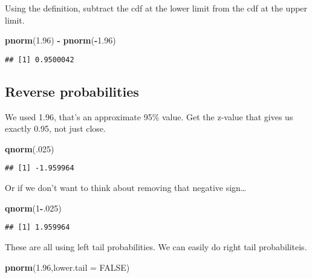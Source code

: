 \documentclass[]{article}
\newenvironment{Shaded}{\begin{snugshade}}{\end{snugshade}}
\newcommand{\KeywordTok}[1]{\textcolor[rgb]{0.13,0.29,0.53}{\textbf{#1}}}
\newcommand{\DataTypeTok}[1]{\textcolor[rgb]{0.13,0.29,0.53}{#1}}
\newcommand{\DecValTok}[1]{\textcolor[rgb]{0.00,0.00,0.81}{#1}}
\newcommand{\FloatTok}[1]{\textcolor[rgb]{0.00,0.00,0.81}{#1}}
\newcommand{\StringTok}[1]{\textcolor[rgb]{0.31,0.60,0.02}{#1}}
\newcommand{\OtherTok}[1]{\textcolor[rgb]{0.56,0.35,0.01}{#1}}
\newcommand{\OperatorTok}[1]{\textcolor[rgb]{0.81,0.36,0.00}{\textbf{#1}}}
\newcommand{\NormalTok}[1]{#1}
\begin{document}
Using the definition, subtract the cdf at the lower limit from the cdf
at the upper limit.

\begin{Shaded}
\begin{Highlighting}[]
\KeywordTok{pnorm}\NormalTok{(}\FloatTok{1.96}\NormalTok{) }\OperatorTok{-}\StringTok{ }\KeywordTok{pnorm}\NormalTok{(}\OperatorTok{-}\FloatTok{1.96}\NormalTok{)}
\end{Highlighting}
\end{Shaded}

\begin{verbatim}
## [1] 0.9500042
\end{verbatim}

\subsection{Reverse probabilities}\label{reverse-probabilities}

We used 1.96, that's an approximate 95\% value. Get the z-value that
gives us exactly 0.95, not just close.

\begin{Shaded}
\begin{Highlighting}[]
\KeywordTok{qnorm}\NormalTok{(.}\DecValTok{025}\NormalTok{)}
\end{Highlighting}
\end{Shaded}

\begin{verbatim}
## [1] -1.959964
\end{verbatim}

Or if we don't want to think about removing that negative sign\ldots{}

\begin{Shaded}
\begin{Highlighting}[]
\KeywordTok{qnorm}\NormalTok{(}\DecValTok{1}\OperatorTok{-}\NormalTok{.}\DecValTok{025}\NormalTok{)}
\end{Highlighting}
\end{Shaded}

\begin{verbatim}
## [1] 1.959964
\end{verbatim}

These are all using left tail probabilities. We can easily do right tail
probabiliteis.

\begin{Shaded}
\begin{Highlighting}[]
\KeywordTok{pnorm}\NormalTok{(}\FloatTok{1.96}\NormalTok{,}\DataTypeTok{lower.tail =} \OtherTok{FALSE}\NormalTok{)}
\end{Highlighting}
\end{Shaded}
\end{document}
